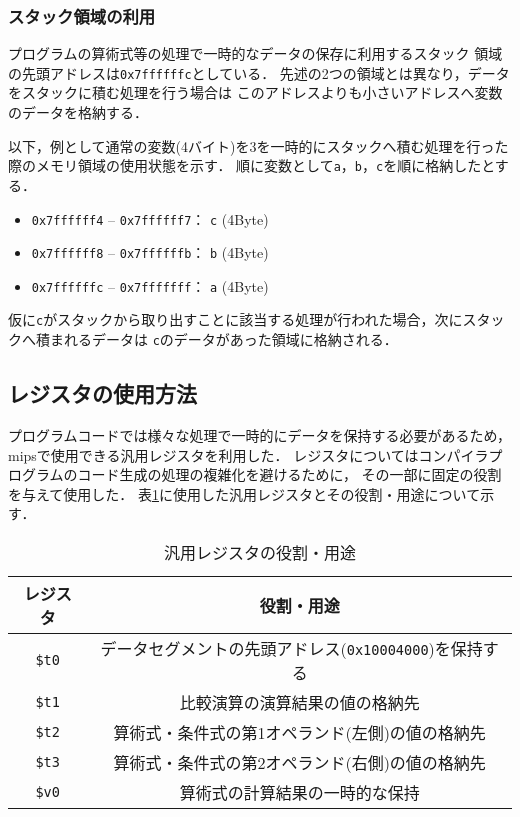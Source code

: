\subsubsection{スタック領域の利用}
プログラムの算術式等の処理で一時的なデータの保存に利用するスタック
領域の先頭アドレスは\verb|0x7ffffffc|としている．
先述の2つの領域とは異なり，データをスタックに積む処理を行う場合は
このアドレスよりも小さいアドレスへ変数のデータを格納する．

以下，例として通常の変数(4バイト)を3を一時的にスタックへ積む処理を行った際のメモリ領域の使用状態を示す．
順に変数として\verb|a|，\verb|b|，\verb|c|を順に格納したとする．

\begin{itemize}
  \item\texttt{0x7ffffff4} -- \texttt{0x7ffffff7}： \verb|c| (4Byte) 
  \item\texttt{0x7ffffff8} -- \texttt{0x7ffffffb}： \verb|b| (4Byte) 
  \item\texttt{0x7ffffffc} -- \texttt{0x7fffffff}： \verb|a| (4Byte) 
\end{itemize}
仮に\verb|c|がスタックから取り出すことに該当する処理が行われた場合，次にスタックへ積まれるデータは
\verb|c|のデータがあった領域に格納される．

\subsection{レジスタの使用方法} \label{sec:reg}
プログラムコードでは様々な処理で一時的にデータを保持する必要があるため，
mipsで使用できる汎用レジスタを利用した．
レジスタについてはコンパイラプログラムのコード生成の処理の複雑化を避けるために，
その一部に固定の役割を与えて使用した．
表\ref{tab:register-tab}に使用した汎用レジスタとその役割・用途について示す．

\begin{table}[htbp]
  \centering
  \begin{tabular}{|c|c|}
    \hline
      レジスタ & 役割・用途 \\
    \hline
    \hline
      \verb|$t0| & データセグメントの先頭アドレス(\verb|0x10004000|)を保持する \\
    \hline
      \verb|$t1| & 比較演算の演算結果の値の格納先 \\
    \hline
      \verb|$t2| & 算術式・条件式の第1オペランド(左側)の値の格納先 \\
    \hline
      \verb|$t3| & 算術式・条件式の第2オペランド(右側)の値の格納先 \\
    \hline
      \verb|$v0| & 算術式の計算結果の一時的な保持 \\
    \hline
  \end{tabular}
  \caption{汎用レジスタの役割・用途}
  \label{tab:register-tab}
\end{table}

